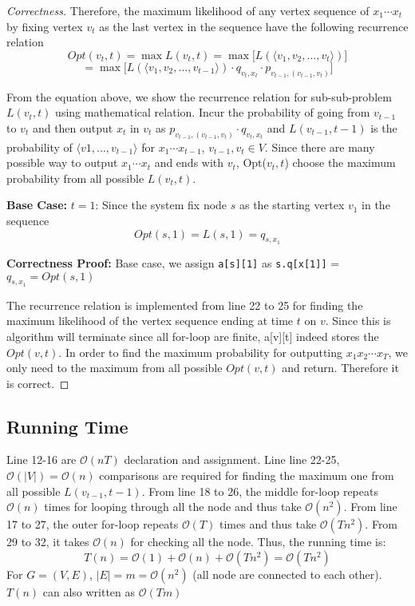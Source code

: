 \documentclass[openany]{article}
\begin{document}
\begin{proof}[Correctness]{}
Therefore, the maximum likelihood of any vertex sequence of $x_1\cdots x_t$ by fixing vertex $v_t$ as the last vertex in the sequence have the following recurrence relation
\[Opt(v_t,t) = \mathop{\max} L(v_t,t)
= \mathop{\max} \Bigg[ L(\langle v_1,v_2,...,v_{t} \rangle) \Bigg]  \]
\[= \mathop{\max} \Bigg[ L(\langle v_1,v_2,...,v_{t-1} \rangle) \cdot q_{v_t,x_t} \cdot p_{v_{t-1},(v_{t-1},v_t)} \Bigg] \]

From the equation above, we show the recurrence relation for sub-sub-problem $L(v_t,t)$ using mathematical relation. Incur the probability of going from $v_{t-1}$ to $v_t$ and then output $x_t$ in $v_t$ as $p_{v_{t-1}, (v_{t-1},v_t)} \cdot q_{v_t,x_t}$ and $L(v_{t-1},t-1)$ is the probability of $\langle v1,...,v_{t-1} \rangle$ for $x_1\cdots x_{t-1}$, $v_{t-1}, v_t \in V$. Since there are many possible way to output $x_1\cdots x_t$ and ends with $v_t$, Opt($v_t,t$) choose the maximum probability from all possible $L(v_t, t)$.


\textbf{Base Case:}
$t = 1$: Since the system fix node $s$ as the starting vertex $v_1$ in the sequence
\[Opt(s,1) = L(s,1) = q_{s,x_1}\]
    
\textbf{Correctness Proof:}
Base case, we assign \texttt{a[s][1]} as \texttt{s.q[x[1]]} = $q_{s,x_1} = Opt(s,1)$

The recurrence relation is implemented from line 22 to 25 for finding the maximum likelihood of the vertex sequence ending at time $t$ on $v$. Since this is algorithm will terminate since all for-loop are finite, a[v][t] indeed stores the $Opt(v,t)$. In order to find the maximum probability for outputting $x_1x_2\cdots x_T$, we only need to the maximum from all possible $Opt(v,t)$ and return. Therefore it is correct.
\end{proof}

\subsection*{Running Time}
Line 12-16 are $\mathcal{O}(nT)$ declaration and assignment. Line line 22-25, $\mathcal{O}(|V|) = \mathcal{O}(n)$ comparisons are required for finding the maximum one from all possible $L(v_{t-1},t-1)$. From line 18 to 26, the middle for-loop repeats $\mathcal{O}(n)$ times for looping through all the node and thus take $\mathcal{O}(n^2)$. From line 17 to 27, the outer for-loop repeats $\mathcal{O}(T)$ times and thus take $\mathcal{O}(Tn^2)$. From 29 to 32, it takes $\mathcal{O}(n)$ for checking all the node. Thus, the running time is:
\[T(n) = \mathcal{O}(1) + \mathcal{O}(n)+ \mathcal{O}(Tn^2) = \mathcal{O}(Tn^2)\]
For $G=(V,E)$, $|E|=m=\mathcal{O}(n^2)$ (all node are connected to each other). $T(n)$ can also written as $\mathcal{O}(Tm)$
\end{document}
